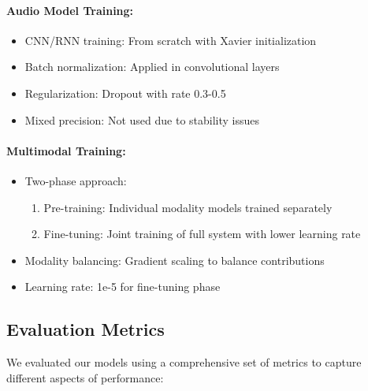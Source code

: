 \documentclass[12pt]{article}
\begin{document}
\paragraph{Audio Model Training:}
\begin{itemize}
    \item CNN/RNN training: From scratch with Xavier initialization
    \item Batch normalization: Applied in convolutional layers
    \item Regularization: Dropout with rate 0.3-0.5
    \item Mixed precision: Not used due to stability issues
\end{itemize}

\paragraph{Multimodal Training:}
\begin{itemize}
    \item Two-phase approach:
    \begin{enumerate}
        \item Pre-training: Individual modality models trained separately
        \item Fine-tuning: Joint training of full system with lower learning rate
    \end{enumerate}
    \item Modality balancing: Gradient scaling to balance contributions
    \item Learning rate: 1e-5 for fine-tuning phase
\end{itemize}

\subsection{Evaluation Metrics}
We evaluated our models using a comprehensive set of metrics to capture different aspects of performance:
\end{document}
